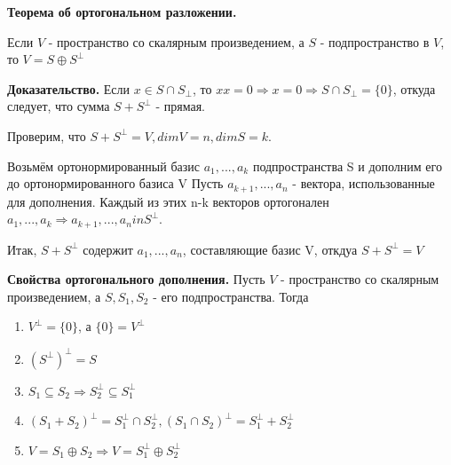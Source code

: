 \documentclass[a4paper]{article}
\begin{document}
    \newpage \begin{center}
                 \begin{Large}
                 \end{Large}
    \end{center}

    \begin{htheorem}
        \textbf{Теорема об ортогональном разложении.}

        Если $V$ - пространство со скалярным произведением, а $S$ - подпространство в $V$, то $V = S \oplus S^{\bot}$
    \end{htheorem}

    \begin{hproof}
        \textbf{Доказательство.} Если $x \in S \cap S_{\bot}$, то $xx=0 \Rightarrow x=0 \Rightarrow S \cap S_{\bot} = \{ 0 \}$, откуда следует, что сумма $S + S^{\bot}$ - прямая.

        Проверим, что $S + S^{\bot} = V, dimV = n, dimS = k$.

        Возьмём ортонормированный базис $a_1, ..., a_k$ подпространства S и дополним его до ортонормированного базиса V Пусть $a_{k+1}, ..., a_n$ - вектора, использованные для дополнения. Каждый из этих n-k векторов ортогонален $a_1, ..., a_k \Rightarrow a_{k+1}, ..., a_n in S^{\bot}$.

        Итак,  $S + S^{\bot}$ содержит $a_1, ..., a_n$, составляющие базис V,  откдуа $S + S^{\bot} = V$
    \end{hproof}


    \begin{htheorem}
        \textbf{Свойства ортогонального дополнения.} Пусть $V$ - пространство со скалярным произведением, а $S, S_1, S_2$ - его подпространства. Тогда
        \begin{enumerate}
            \item $V^{\bot} = \{ 0 \}$, а $\{ 0 \} = V^{\bot}$
            \item $(S^{\bot})^{\bot} = S$
            \item $S_1 \subseteq S_2 \Rightarrow S_2^{\bot} \subseteq S_1^{\bot}$
            \item $(S_1+S_2)^{\bot} = S_1^{\bot} \cap S_2^{\bot}, (S_1 \cap S_2)^{\bot} = S_1^{\bot} + S_2^{\bot}$
            \item $V = S_1 \oplus S_2 \Rightarrow V = S_1^{\bot} \oplus S_2^{\bot}$
        \end{enumerate}
    \end{htheorem}
\end{document}
